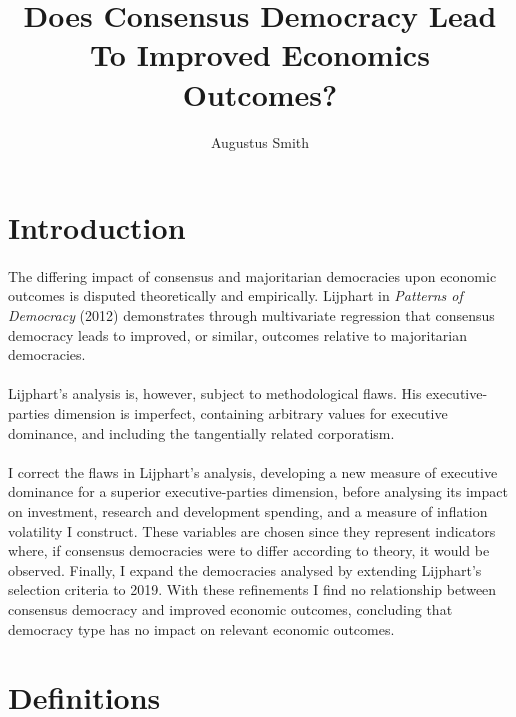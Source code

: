 \documentclass[11pt, oneside]{article}   	%
\title{Does Consensus Democracy Lead To Improved Economics Outcomes?}
\author{Augustus Smith}
\date{\vspace{-2em}}
\let\oldparagraph\paragraph
\renewcommand{\paragraph}[1]{\oldparagraph{#1}\mbox{}}
\begin{document}
\maketitle

\section{Introduction}

\paragraph{}
The differing impact of consensus and majoritarian democracies upon economic outcomes is disputed theoretically and empirically. Lijphart in \textit{Patterns of Democracy} (2012) demonstrates through multivariate regression that consensus democracy leads to improved, or similar, outcomes relative to majoritarian democracies.
	
\paragraph{}
Lijphart’s analysis is, however, subject to methodological flaws. His executive-parties dimension is imperfect, containing arbitrary values for executive dominance, and including the tangentially related corporatism.

\paragraph{}
I correct the flaws in Lijphart’s analysis, developing a new measure of executive dominance for a superior executive-parties dimension, before analysing its impact on investment, research and development spending, and a measure of inflation volatility I construct. These variables are chosen since they represent indicators where, if consensus democracies were to differ according to theory, it would be observed. Finally, I expand the democracies analysed by extending Lijphart’s selection criteria to 2019. With these refinements I find no relationship between consensus democracy and improved economic outcomes, concluding that democracy type has no impact on relevant economic outcomes.

\section{Definitions}
\end{document}
